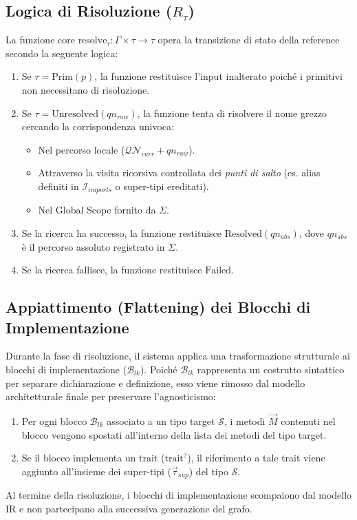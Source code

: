 \subsection{Logica di Risoluzione ($R_{\tau}$)}
La funzione core $\text{resolve}_{\tau} : \Gamma \times \tau \to
\tau$ opera la transizione di stato della reference secondo la seguente logica:
\begin{enumerate}
  \item Se $\tau = \text{Prim}(p)$, la funzione restituisce l'input
    inalterato poiché i primitivi non necessitano di risoluzione.
  \item Se $\tau = \text{Unresolved}(qn_{raw})$, la funzione tenta di
    risolvere il nome grezzo cercando la corrispondenza univoca:
    \begin{itemize}
      \item Nel percorso locale ($\mathcal{QN}_{curr} + qn_{raw}$).
      \item Attraverso la visita ricorsiva controllata dei
        \textit{punti di salto} (es. alias definiti in
        $\mathcal{I}_{imports}$ o super-tipi ereditati).
      \item Nel Global Scope fornito da $\Sigma$.
    \end{itemize}
  \item Se la ricerca ha successo, la funzione restituisce
    $\text{Resolved}(qn_{abs})$, dove $qn_{abs}$ è il percorso
    assoluto registrato in $\Sigma$.
  \item Se la ricerca fallisce, la funzione restituisce $\text{Failed}$.
\end{enumerate}

\subsection{Appiattimento (Flattening) dei Blocchi di Implementazione}
Durante la fase di risoluzione, il sistema applica una trasformazione
strutturale ai blocchi di implementazione ($\mathcal{B}_{lk}$).
Poiché $\mathcal{B}_{lk}$ rappresenta un costrutto sintattico per
separare dichiarazione e definizione, esso viene rimosso dal modello
architetturale finale per preservare l'agnosticismo:
\begin{enumerate}
  \item Per ogni blocco $\mathcal{B}_{lk}$ associato a un tipo target
    $\mathcal{S}$, i metodi $\vec{M}$ contenuti nel blocco vengono
    spostati all'interno della lista dei metodi del tipo target.
  \item Se il blocco implementa un trait ($\text{trait}^?$), il
    riferimento a tale trait viene aggiunto all'insieme dei
    super-tipi ($\vec{\tau}_{sup}$) del tipo $\mathcal{S}$.
\end{enumerate}
Al termine della risoluzione, i blocchi di implementazione scompaiono
dal modello IR e non partecipano alla successiva generazione del grafo.

